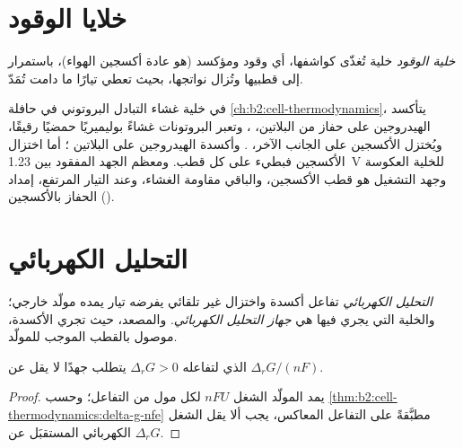 \section{خلايا الوقود}

\begin{definition}\label{def:b2:batteries-electrolysis:fuel-cell}
\emph{خلية الوقود} خلية تُغذّى كواشفها، أي وقود
ومؤكسد (هو عادة أكسجين الهواء)، باستمرار إلى
قطبيها وتُزال نواتجها، بحيث تعطي تيارًا ما دامت
تُمَدّ.
\end{definition}

في خلية غشاء التبادل البروتوني في حافلة
\cref{ch:b2:cell-thermodynamics}، يتأكسد الهيدروجين على حفاز من البلاتين،
، وتعبر البروتونات غشاءً بوليميريًا حمضيًا رقيقًا، ويُختزل الأكسجين
على الجانب الآخر، . وأكسدة الهيدروجين
على البلاتين ؛ أما اختزال الأكسجين فبطيء على كل
قطب. ومعظم الجهد المفقود بين \qty{1.23}{V} للخلية
العكوسة وجهد التشغيل هو  قطب الأكسجين،
والباقي مقاومة الغشاء، وعند التيار المرتفع، إمداد الحفاز
بالأكسجين ().

\section{التحليل الكهربائي}

\begin{definition}\label{def:b2:batteries-electrolysis:electrolysis}
\emph{التحليل الكهربائي} تفاعل أكسدة واختزال غير تلقائي
يفرضه تيار يمده مولّد خارجي؛ والخلية التي يجري فيها
هي \emph{جهاز التحليل الكهربائي}. والمصعد، حيث تجري
الأكسدة، موصول بالقطب الموجب للمولّد.
\end{definition}

\begin{proposition}\label{prop:b2:batteries-electrolysis:minimum-voltage}
 الذي لتفاعله $\Delta_r G > 0$ يتطلب جهدًا لا يقل
عن $\Delta_r G/(nF)$.
\end{proposition}

\begin{proof}
يمد المولّد الشغل $nFU$ لكل مول من التفاعل؛ وحسب
\cref{thm:b2:cell-thermodynamics:delta-g-nfe} مطبَّقةً على التفاعل المعاكس، يجب ألا يقل
الشغل الكهربائي المستقبَل عن $\Delta_r G$.
\end{proof}

